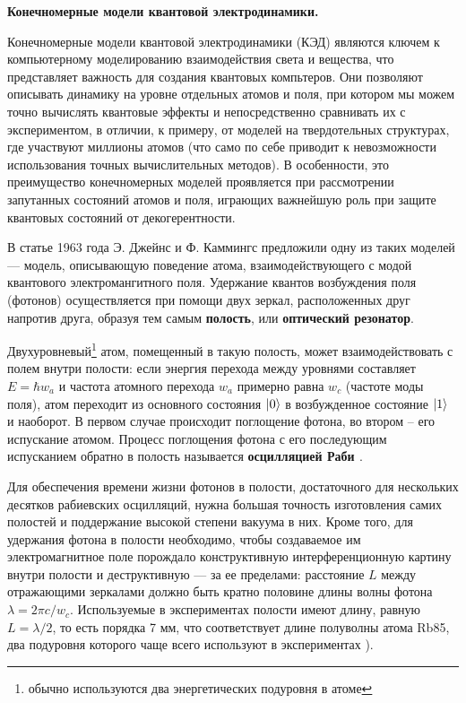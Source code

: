 \clearpage
\indent\textbf{Конечномерные модели квантовой электродинамики.}

Конечномерные модели квантовой электродинамики (КЭД) являются ключем к компьютерному моделированию взаимодействия света и вещества, что представляет важность для создания квантовых компьтеров. Они позволяют описывать динамику на уровне отдельных атомов и поля, при котором мы можем точно вычислять квантовые эффекты и непосредственно сравнивать их с экспериментом, в отличии, к примеру, от моделей на твердотельных структурах, где участвуют миллионы атомов (что само по себе приводит к невозможности использования точных вычислительных методов). В особенности, это преимущество конечномерных моделей проявляется при рассмотрении запутанных состояний атомов и поля, играющих важнейшую роль при защите квантовых состояний от декогерентности.

В статье 1963 года \cite{jc_comparison} Э. Джейнс и Ф. Каммингс предложили одну из таких моделей --- модель, описывающую поведение атома, взаимодействующего с модой квантового электромангитного поля. Удержание квантов возбуждения поля (фотонов) осуществляется при помощи двух зеркал, расположенных друг напротив друга, образуя тем самым \textbf{полость}, или \textbf{оптический резонатор}.

\begin{figure}[h!]
	\noindent{}
\end{figure}

Двухуровневый\footnote{обычно используются два энергетических подуровня в атоме} атом, помещенный в такую полость, может взаимодействовать с полем внутри полости: если энергия перехода между уровнями составляет $E = \hbar w_{a}$ и частота атомного перехода $w_{a}$ примерно равна $w_{c}$ (частоте моды поля), атом переходит из основного состояния $|0\rangle$ в возбужденное состояние $|1\rangle$ и наоборот. В первом случае происходит поглощение фотона, во втором -- его испускание атомом. Процесс поглощения фотона с его последующим испусканием обратно в полость называется \textbf{осцилляцией Раби \cite{rabi_1,rabi_2,rabi_3,rabi_4}}. 

Для обеспечения времени жизни фотонов в полости, достаточного для нескольких десятков рабиевских осцилляций, нужна большая точность изготовления самих полостей и поддержание высокой степени вакуума в них. Кроме того, для удержания фотона в полости необходимо, чтобы создаваемое им электромагнитное поле порождало конструктивную интерференционную картину внутри полости и деструктивную --- за ее пределами: расстояние $L$ между отражающими зеркалами должно быть кратно половине длины волны фотона $\lambda = 2\pi c/w_{c}$. Используемые в экспериментах полости имеют длину, равную $L = \lambda/2$, то есть порядка 7 мм, что соответствует длине полуволны атома Rb85, два подуровня которого чаще всего используют в экспериментах \cite{rempe,rb85_1,rb85_2,rb85_3}).

